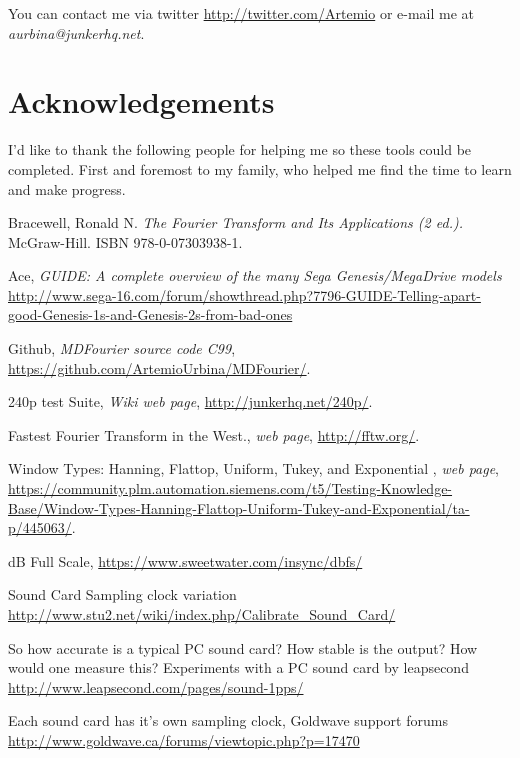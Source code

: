 \documentclass[10pt,a4paper]{report}
\begin{document}
\begin{appendices}
You can contact me via twitter \url{http://twitter.com/Artemio} or e-mail me at \textit{aurbina@junkerhq.net}.

\chapter{Acknowledgements}

I'd like to thank the following people for helping me so these tools could be completed. First and foremost to my family, who helped me find the time to learn and make progress.

\end{appendices}

\begin{thebibliography}{9}
	Bracewell, Ronald N. 
	\textit{The Fourier Transform and Its Applications (2 ed.).}
	McGraw-Hill. ISBN 978-0-07303938-1.
	
	Ace, \textit{GUIDE: A complete overview of the many Sega Genesis/MegaDrive models}
	\url{http://www.sega-16.com/forum/showthread.php?7796-GUIDE-Telling-apart-good-Genesis-1s-and-Genesis-2s-from-bad-ones}
	
	Github,
	\textit{MDFourier source code C99},
	\url{https://github.com/ArtemioUrbina/MDFourier/}.
	
	240p test Suite,
	\textit{Wiki web page},
	\url{http://junkerhq.net/240p/}.
	
	Fastest Fourier Transform in the West.,
	\textit{web page},
	\url{http://fftw.org/}.
	
	Window Types: Hanning, Flattop, Uniform, Tukey, and Exponential ,
	\textit{web page},
	\url{https://community.plm.automation.siemens.com/t5/Testing-Knowledge-Base/Window-Types-Hanning-Flattop-Uniform-Tukey-and-Exponential/ta-p/445063/}.
	
	dB Full Scale, 
	\url{https://www.sweetwater.com/insync/dbfs/}
	
	Sound Card Sampling clock variation
	\url{http://www.stu2.net/wiki/index.php/Calibrate_Sound_Card/}
	
	So how accurate is a typical PC sound card? How stable is the output? How would one measure this?
	Experiments with a PC sound card by leapsecond
	\url{http://www.leapsecond.com/pages/sound-1pps/}
	
	Each sound card has it's own sampling clock, Goldwave support forums
	\url{http://www.goldwave.ca/forums/viewtopic.php?p=17470}
	

\end{thebibliography}
\end{document}
